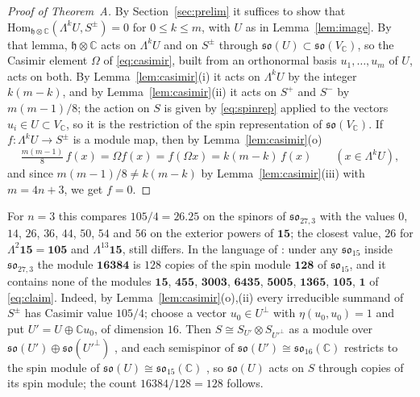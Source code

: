 \documentclass[11pt]{amsart}
\theoremstyle{remark}
\newcommand{\so}{\mathfrak{so}}
\newcommand{\h}{\mathfrak{h}}
\newcommand{\C}{\mathbb{C}}
\begin{document}
\begin{proof}[Proof of Theorem~A]
By Section~\ref{sec:prelim} it suffices to show that $\mathrm{Hom}_{\h\otimes\C}(\Lambda^kU,S^\pm)=0$ for $0\le k\le m$, with $U$ as in Lemma~\ref{lem:image}. By that lemma, $\h\otimes\C$ acts on $\Lambda^kU$ and on $S^\pm$ through $\so(U)\subset\so(V_\C)$, so the Casimir element $\Omega$ of \eqref{eq:casimir}, built from an orthonormal basis $u_1,\dots,u_m$ of $U$, acts on both. By Lemma~\ref{lem:casimir}(i) it acts on $\Lambda^kU$ by the integer $k(m-k)$, and by Lemma~\ref{lem:casimir}(ii) it acts on $S^+$ and $S^-$ by $m(m-1)/8$; the action on $S$ is given by \eqref{eq:spinrep} applied to the vectors $u_i\in U\subset V_\C$, so it is the restriction of the spin representation of $\so(V_\C)$. If $f:\Lambda^kU\to S^\pm$ is a module map, then by Lemma~\ref{lem:casimir}(o)
\[
\tfrac{m(m-1)}{8}\,f(x)=\Omega f(x)=f(\Omega x)=k(m-k)\,f(x)\qquad(x\in\Lambda^kU),
\]
and since $m(m-1)/8\ne k(m-k)$ by Lemma~\ref{lem:casimir}(iii) with $m=4n+3$, we get $f=0$.
\end{proof}

For $n=3$ this compares $105/4=26.25$ on the spinors of $\so_{27,3}$ with the values $0$, $14$, $26$, $36$, $44$, $50$, $54$ and $56$ on the exterior powers of $\mathbf{15}$; the closest value, $26$ for $\Lambda^2\mathbf{15}=\mathbf{105}$ and $\Lambda^{13}\mathbf{15}$, still differs. In the language of \cite{RMC20}: under any $\so_{15}$ inside $\so_{27,3}$ the module $\mathbf{16384}$ is $128$ copies of the spin module $\mathbf{128}$ of $\so_{15}$, and it contains none of the modules $\mathbf{15}$, $\mathbf{455}$, $\mathbf{3003}$, $\mathbf{6435}$, $\mathbf{5005}$, $\mathbf{1365}$, $\mathbf{105}$, $\mathbf{1}$ of \eqref{eq:claim}. Indeed, by Lemma~\ref{lem:casimir}(o),(ii) every irreducible summand of $S^\pm$ has Casimir value $105/4$; choose a vector $u_0\in U^\perp$ with $\eta(u_0,u_0)=1$ and put $U'=U\oplus\C u_0$, of dimension $16$. Then $S\cong S_{U'}\otimes S_{U'^\perp}$ as a module over $\so(U')\oplus\so(U'^\perp)$ \cite[Ch.~I, \S 1]{LM89}, and each semispinor of $\so(U')\cong\so_{16}(\C)$ restricts to the spin module of $\so(U)\cong\so_{15}(\C)$ \cite[\S 20.1]{FH91}, so $\so(U)$ acts on $S$ through copies of its spin module; the count $16384/128=128$ follows.
\end{document}
